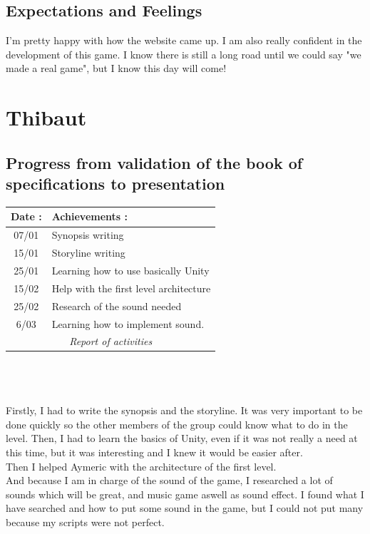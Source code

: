 		\subsection{Expectations and Feelings}
			I'm pretty happy with how the website came up. I am also really confident in the development of this game.
			I know there is still a long road until we could say "we made a real game", but I know this day will come!

	\section{Thibaut}
		\subsection{Progress from validation of the book of specifications to  presentation}
			\begin{tabular}{|c|l|}
				\hline \cellcolor{gray}Date :	& \cellcolor{gray}Achievements :\\
				\hline 07/01& Synopsis writing\\
				\hline 15/01& Storyline writing\\
				\hline 25/01& Learning how to use basically Unity\\
				\hline 15/02& Help with the first level architecture\\
				\hline 25/02& Research of the sound needed\\
				\hline 6/03& Learning how to implement sound.\\
				\hline \multicolumn{2}{c}{\textit{Report of activities}}
			\end{tabular}
			\\\\\\
			Firstly, I had to write the synopsis and the storyline.
			It was very important to be done quickly so the other members of the group could know what to do in the level.
			Then, I had to learn the basics of Unity, even if it was not really a need at this time, but it was interesting
			and I knew it would be easier after.
			\\
			Then I helped Aymeric with the architecture of the first level.
			\\
			And because I am in charge of the sound of the game, I researched a lot of sounds which will be great,
			and music game aswell as sound effect. I found what I have searched and how to put some sound in the game,
			but I could not put many because my scripts were not perfect.

